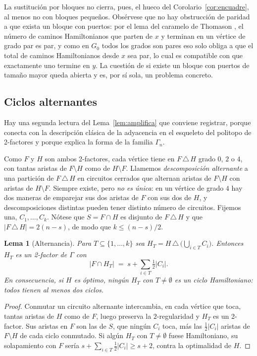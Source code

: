 \documentclass[11pt,a4paper]{article}
\newtheorem{lema}[teorema]{Lema}
\theoremstyle{definition}
\theoremstyle{remark}
\begin{document}
La sustitución por bloques no cierra, pues, el hueco del Corolario~\ref{cor:encuadre}, al menos no con bloques pequeños. Obsérvese que no hay obstrucción de paridad a que exista un bloque con puertos: por el lema del caramelo de Thomason \cite{thomason78}, el número de caminos Hamiltonianos que parten de $x$ y terminan en un vértice de grado par es par, y como en $G_0$ todos los grados son pares eso solo obliga a que el total de caminos Hamiltonianos desde $x$ sea par, lo cual es compatible con que exactamente uno termine en $y$. La cuestión de si existe un bloque con puertos de tamaño mayor queda abierta y es, por sí sola, un problema concreto.

\subsection{Ciclos alternantes}\label{sub:alternantes}

Hay una segunda lectura del Lema~\ref{lem:amplifica} que conviene registrar, porque conecta con la descripción clásica de la adyacencia en el esqueleto del politopo de 2-factores y porque explica la forma de la familia $\Gamma_n$.

Como $F$ y $H$ son ambos 2-factores, cada vértice tiene en $F\,\triangle\,H$ grado $0$, $2$ o $4$, con tantas aristas de $F\setminus H$ como de $H\setminus F$. Llamemos \emph{descomposición alternante} a una partición de $F\,\triangle\,H$ en circuitos cerrados que alternan aristas de $F\setminus H$ con aristas de $H\setminus F$. Siempre existe, pero \emph{no es única}: en un vértice de grado $4$ hay dos maneras de emparejar sus dos aristas de $F$ con sus dos de $H$, y descomposiciones distintas pueden tener distinto número de circuitos. Fijemos una, $C_1,\dots,C_k$. Nótese que $S=F\cap H$ es disjunto de $F\,\triangle\,H$ y que $|F\,\triangle\,H|=2(n-s)$, de modo que $k\le (n-s)/2$.

\begin{lema}[Alternancia]\label{lem:alternancia}
Para $T\subseteq\{1,\dots,k\}$ sea $H_T=H\,\triangle\,\bigl(\bigcup_{i\in T}C_i\bigr)$. Entonces $H_T$ es un 2-factor de $\Gamma$ con
\[
|F\cap H_T|\;=\;s+\sum_{i\in T}\tfrac12|C_i| .
\]
En consecuencia, si $H$ es óptimo, ningún $H_T$ con $T\ne\emptyset$ es un ciclo Hamiltoniano: todos tienen al menos dos ciclos.
\end{lema}

\begin{proof}
Conmutar un circuito alternante intercambia, en cada vértice que toca, tantas aristas de $H$ como de $F$, luego preserva la $2$-regularidad y $H_T$ es un 2-factor. Sus aristas en $F$ son las de $S$, que ningún $C_i$ toca, más las $\tfrac12|C_i|$ aristas de $F\setminus H$ de cada ciclo conmutado. Si algún $H_T$ con $T\ne\emptyset$ fuese Hamiltoniano, su solapamiento con $F$ sería $s+\sum_{i\in T}\tfrac12|C_i|\ge s+2$, contra la optimalidad de $H$.
\end{proof}
\end{document}
